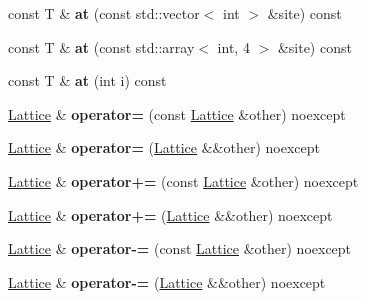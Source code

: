 \begin{DoxyCompactItemize}
\item 
const T \& {\bfseries at} (const std\+::vector$<$ int $>$ \&site) const \hypertarget{classLattice_a75069863087489b2977074cd52ed8f73}{}\label{classLattice_a75069863087489b2977074cd52ed8f73}

\item 
const T \& {\bfseries at} (const std\+::array$<$ int, 4 $>$ \&site) const \hypertarget{classLattice_a5841feb3f15f2ee81888203dcdb49703}{}\label{classLattice_a5841feb3f15f2ee81888203dcdb49703}

\item 
const T \& {\bfseries at} (int i) const \hypertarget{classLattice_af9c0f4cc4d74390b488a8f5a8c766934}{}\label{classLattice_af9c0f4cc4d74390b488a8f5a8c766934}

\item 
\hyperlink{classLattice}{Lattice} \& {\bfseries operator=} (const \hyperlink{classLattice}{Lattice} \&other) noexcept\hypertarget{classLattice_a70008d522e42d75886c1398e3a00a77d}{}\label{classLattice_a70008d522e42d75886c1398e3a00a77d}

\item 
\hyperlink{classLattice}{Lattice} \& {\bfseries operator=} (\hyperlink{classLattice}{Lattice} \&\&other) noexcept\hypertarget{classLattice_aee5bfa33b3dc9fb895972637214b4ad5}{}\label{classLattice_aee5bfa33b3dc9fb895972637214b4ad5}

\item 
\hyperlink{classLattice}{Lattice} \& {\bfseries operator+=} (const \hyperlink{classLattice}{Lattice} \&other) noexcept\hypertarget{classLattice_a8287a398257dab76e3f7445a27cd2d85}{}\label{classLattice_a8287a398257dab76e3f7445a27cd2d85}

\item 
\hyperlink{classLattice}{Lattice} \& {\bfseries operator+=} (\hyperlink{classLattice}{Lattice} \&\&other) noexcept\hypertarget{classLattice_a8a524b7c0b8f2e5e95c1e08b7fae60e7}{}\label{classLattice_a8a524b7c0b8f2e5e95c1e08b7fae60e7}

\item 
\hyperlink{classLattice}{Lattice} \& {\bfseries operator-\/=} (const \hyperlink{classLattice}{Lattice} \&other) noexcept\hypertarget{classLattice_aadebcf9c9b2afe5c2216fe63c27110a7}{}\label{classLattice_aadebcf9c9b2afe5c2216fe63c27110a7}

\item 
\hyperlink{classLattice}{Lattice} \& {\bfseries operator-\/=} (\hyperlink{classLattice}{Lattice} \&\&other) noexcept\hypertarget{classLattice_a848894fff4a8443567d203840ecb183d}{}\label{classLattice_a848894fff4a8443567d203840ecb183d}


\end{DoxyCompactItemize}
